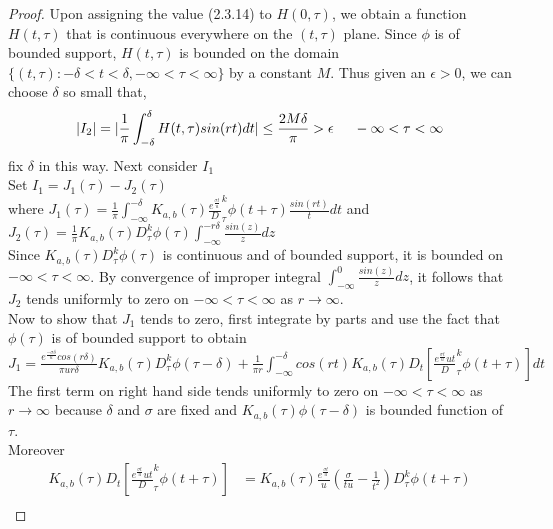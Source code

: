 \begin{proof}
Upon assigning the value (2.3.14) to $H(0,\tau)$, we obtain a function $ H(t,\tau) $ that is continuous everywhere on the $ (t,\tau) $ plane. Since $ \phi $ is of bounded support, $ H(t,\tau) $ is bounded on the domain $\lbrace (t,\tau):-\delta < t < \delta ,-\infty < \tau < \infty \rbrace$ by a constant $M$. Thus given an $ \epsilon >0 $, we can choose $ \delta $ so small that,
 \begin{equation}
 \vert I_{2}\vert = \vert\frac{1}{\pi}\int_{-\delta}^{\delta}H(t,\tau)sin(rt)dt\vert \leq \frac{2M\delta}{\pi} > \epsilon \hspace{0.5cm} -\infty < \tau < \infty 
 \end{equation}
 fix $ \delta $ in this way. Next consider $ I_{1} $ \\
 Set $  I_{1} = J_{1}(\tau)-J_{2}(\tau) $\\
 where $ J_{1}(\tau) = \frac{1}{\pi}\int_{-\infty}^{-\delta}K_{a,b}(\tau)\frac{e^{\frac{\sigma t}{u}}}D_{\tau}^{k}\phi(t+\tau)\frac{sin(rt)}{t}dt $ \hspace{0.5cm}  and 
 $ J_{2}(\tau) = \frac{1}{\pi}K_{a,b}(\tau)D_{\tau}^{k}\phi(\tau)\int_{-\infty}^{-r\delta}\frac{sin(z)}{z}dz $\\
 Since $ K_{a,b}(\tau)D_{\tau}^{k}\phi(\tau) $ is continuous and of bounded support, it is bounded on $ -\infty < \tau < \infty $. By convergence of improper integral $ \int_{-\infty}^{0}\frac{sin(z)}{z}dz $, it follows that $ J_{2} $ tends uniformly to zero on $ -\infty < \tau < \infty $ as $ r\rightarrow \infty. $\\
 Now to show that $ J_{1} $ tends to zero, first integrate by parts and use the fact that $ \phi(\tau) $ is of bounded support to obtain \\
 $ J_{1} = \frac{e^{\frac{-\sigma \delta}{u}}cos(r\delta)}{\pi u r\delta}K_{a,b}(\tau)D_{\tau}^{k}\phi(\tau-\delta)+\frac{1}{\pi r}\int_{-\infty}^{-\delta} cos(rt)K_{a,b}(\tau)D_{t}[\frac{e^{\frac{\sigma t}{u}}{ut}}D_{\tau}^{k}\phi(t+\tau)]dt$\\
 The first term on right hand side tends uniformly to zero on $ -\infty < \tau < \infty $ as $ r\rightarrow \infty $ because $ \delta $ and $ \sigma $  are fixed and $ K_{a,b}(\tau)\phi(\tau-\delta) $ is bounded function of $ \tau $.\\
 Moreover 
 \begin{align*}
 K_{a,b}(\tau)D_{t}[\frac{e^{\frac{\sigma t}{u}}{ut}}D_{\tau}^{k}\phi(t+\tau)]&=K_{a,b}(\tau)\frac{e^{\frac{\sigma t}{u}}}{u}(\frac{\sigma}{tu}-\frac{1}{t^{2}})D_{\tau}^{k}\phi(t+\tau)\\

\end{align*}
\end{proof}

